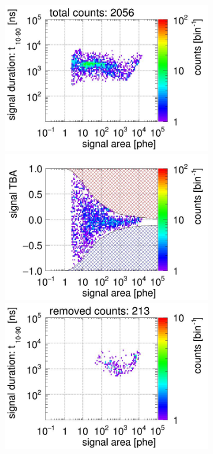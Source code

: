 \begin{landscape}
\begin{figure}[!p]
\begin{subfigure}[t]{0.32\textwidth}
			\includegraphics[width=\figurewidth,clip,trim={0 98 0 15}]{Figures/GasTest/CutsValid/res64767/pdpa10Vecfig64767.jpg}
			\includegraphics[width=\figurewidth,clip,trim={0 98 0 40}]{Figures/GasTest/CutsValid/res64767/tbapa10Vecfig64767.jpg}
			\includegraphics[width=\figurewidth,clip,trim={0 98 0 15}]{Figures/GasTest/CutsValid/res64767/pdpaX10Vecfig64767.jpg}

\end{subfigure}
\end{figure}
\end{landscape}
